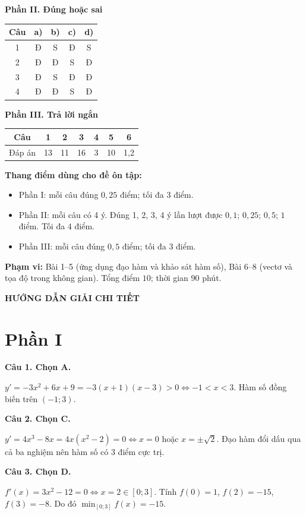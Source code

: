 \documentclass[12pt,a4paper]{article}
\newcommand{\loigiai}[1]{\par\medskip\Needspace{4\baselineskip}\noindent\textbf{#1}\par\nobreak}
\begin{document}
\textbf{Phần II. Đúng hoặc sai}
\begin{center}
\renewcommand{\arraystretch}{1.4}
\begin{tabular}{|c|c|c|c|c|}\hline
Câu & a) & b) & c) & d)\\\hline
1 & Đ & S & Đ & S\\\hline
2 & Đ & Đ & S & Đ\\\hline
3 & Đ & S & Đ & Đ\\\hline
4 & Đ & Đ & S & Đ\\\hline
\end{tabular}
\end{center}

\textbf{Phần III. Trả lời ngắn}
\begin{center}
\renewcommand{\arraystretch}{1.5}
\begin{tabular}{|c|c|c|c|c|c|c|}\hline
Câu & 1 & 2 & 3 & 4 & 5 & 6\\\hline
Đáp án & 13 & 11 & 16 & 3 & 10 & 1,2 \\\hline
\end{tabular}
\end{center}

\textbf{Thang điểm dùng cho đề ôn tập:}
\begin{itemize}[leftmargin=*,itemsep=3pt]
\item Phần I: mỗi câu đúng $0{,}25$ điểm; tối đa $3$ điểm.
\item Phần II: mỗi câu có 4 ý. Đúng 1, 2, 3, 4 ý lần lượt được $0{,}1$; $0{,}25$; $0{,}5$; $1$ điểm. Tối đa $4$ điểm.
\item Phần III: mỗi câu đúng $0{,}5$ điểm; tối đa $3$ điểm.
\end{itemize}
\textbf{Phạm vi:} Bài 1–5 (ứng dụng đạo hàm và khảo sát hàm số), Bài 6–8 (vectơ và tọa độ trong không gian).
Tổng điểm $10$; thời gian $90$ phút.

\newpage
\begin{center}\Large\textbf{HƯỚNG DẪN GIẢI CHI TIẾT}\end{center}
\section*{\large Phần I}
\loigiai{Câu 1. Chọn A.}
$y'=-3x^2+6x+9=-3(x+1)(x-3)>0\Leftrightarrow -1<x<3$. Hàm số đồng biến trên $(-1;3)$.

\loigiai{Câu 2. Chọn C.}
$y'=4x^3-8x=4x(x^2-2)=0\Leftrightarrow x=0$ hoặc $x=\pm\sqrt2$. Đạo hàm đổi dấu qua cả ba nghiệm nên hàm số có 3 điểm cực trị.

\loigiai{Câu 3. Chọn D.}
$f'(x)=3x^2-12=0\Leftrightarrow x=2\in[0;3]$. Tính $f(0)=1$, $f(2)=-15$, $f(3)=-8$. Do đó $\min_{[0;3]}f(x)=-15$.
\end{document}
